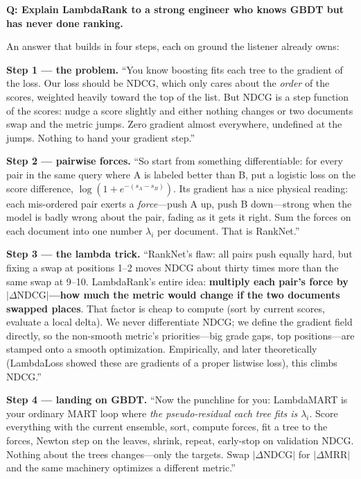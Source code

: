 \begin{interviewq}
\textbf{Q: Explain LambdaRank to a strong engineer who knows GBDT but has never done ranking.}

 \quad {} \quad \badgefreq{\freqhigh}

\stronganswer

An answer that builds in four steps, each on ground the listener already owns:

\textbf{Step 1 --- the problem.} ``You know boosting fits each tree to the gradient of the loss. Our loss should be NDCG, which only cares about the \textit{order} of the scores, weighted heavily toward the top of the list. But NDCG is a step function of the scores: nudge a score slightly and either nothing changes or two documents swap and the metric jumps. Zero gradient almost everywhere, undefined at the jumps. Nothing to hand your gradient step.''

\textbf{Step 2 --- pairwise forces.} ``So start from something differentiable: for every pair in the same query where A is labeled better than B, put a logistic loss on the score difference, $\log(1+e^{-(s_A - s_B)})$. Its gradient has a nice physical reading: each mis-ordered pair exerts a \textit{force}---push A up, push B down---strong when the model is badly wrong about the pair, fading as it gets it right. Sum the forces on each document into one number $\lambda_i$ per document. That is RankNet.''

\textbf{Step 3 --- the lambda trick.} ``RankNet's flaw: all pairs push equally hard, but fixing a swap at positions 1--2 moves NDCG about thirty times more than the same swap at 9--10. LambdaRank's entire idea: \textbf{multiply each pair's force by $|\Delta\text{NDCG}|$---how much the metric would change if the two documents swapped places}. That factor is cheap to compute (sort by current scores, evaluate a local delta). We never differentiate NDCG; we define the gradient field directly, so the non-smooth metric's priorities---big grade gaps, top positions---are stamped onto a smooth optimization. Empirically, and later theoretically (LambdaLoss showed these are gradients of a proper listwise loss), this climbs NDCG.''

\textbf{Step 4 --- landing on GBDT.} ``Now the punchline for you: LambdaMART is your ordinary MART loop where \textit{the pseudo-residual each tree fits is $\lambda_i$}. Score everything with the current ensemble, sort, compute forces, fit a tree to the forces, Newton step on the leaves, shrink, repeat, early-stop on validation NDCG. Nothing about the trees changes---only the targets. Swap $|\Delta\text{NDCG}|$ for $|\Delta\text{MRR}|$ and the same machinery optimizes a different metric.''


\end{interviewq}
